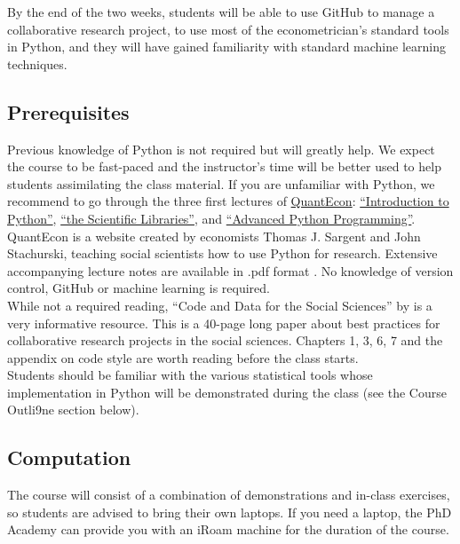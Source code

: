 \documentclass{amsart}
\theoremstyle{definition}
\theoremstyle{remark}
\numberwithin{equation}{section}
\begin{document}
By the end of the two weeks, students will be able to use GitHub to manage a collaborative research project, to use most of the econometrician's standard tools in Python, and they will have gained familiarity with standard machine learning techniques.

\subsection*{Prerequisites}

Previous knowledge of Python is not required but will greatly help. We expect the course to be fast-paced and the instructor's time will be better used to help students assimilating the class material. If you are unfamiliar with Python, we recommend to go through the three first lectures of \href{https://lectures.quantecon.org/py/}{QuantEcon}: \href{https://lectures.quantecon.org/py/index_learning_python.html}{``Introduction to Python''}, \href{https://lectures.quantecon.org/py/index_python_scientific_libraries.html}{``the Scientific Libraries''}, and \href{https://lectures.quantecon.org/py/index_advanced_python_programming.html}{``Advanced Python Programming''}. QuantEcon is a website created by economists Thomas J. Sargent and John Stachurski, teaching social scientists how to use Python for research. Extensive accompanying lecture notes are available in .pdf format \citep{sargent2019lectures}. No knowledge of version control, GitHub or machine learning is required.\\

While not a required reading, ``Code and Data for the Social Sciences'' by \cite{gentzkow2014code} is a very informative resource. This is a 40-page long paper about best practices for collaborative research projects in the social sciences. Chapters 1, 3, 6, 7 and the appendix on code style are worth reading before the class starts.\\

Students should be familiar with the various statistical tools whose implementation in Python will be demonstrated during the class (see the Course Outli9ne section below).

\subsection*{Computation}

The course will consist of a combination of demonstrations and in-class exercises, so students are advised to bring their own laptops. If you need a laptop, the PhD Academy can provide you with an iRoam machine for the duration of the course.\\
\end{document}
